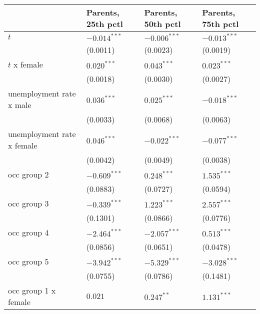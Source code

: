 \begin{tabular}{llll}
\toprule
{} & Parents, 25th pctl & Parents, 50th pctl & Parents, 75th pctl \\
\midrule
$t$                                    &     $-0.014^{***}$ &     $-0.006^{***}$ &     $-0.013^{***}$ \\
                                       &           (0.0011) &           (0.0023) &           (0.0019) \\
$t$ x female                           &      $0.020^{***}$ &      $0.043^{***}$ &      $0.023^{***}$ \\
                                       &           (0.0018) &           (0.0030) &           (0.0027) \\
unemployment rate x male               &      $0.036^{***}$ &      $0.025^{***}$ &     $-0.018^{***}$ \\
                                       &           (0.0033) &           (0.0068) &           (0.0063) \\
unemployment rate x female             &      $0.046^{***}$ &     $-0.022^{***}$ &     $-0.077^{***}$ \\
                                       &           (0.0042) &           (0.0049) &           (0.0038) \\
occ group 2                            &     $-0.609^{***}$ &      $0.248^{***}$ &      $1.535^{***}$ \\
                                       &           (0.0883) &           (0.0727) &           (0.0594) \\
occ group 3                            &     $-0.339^{***}$ &      $1.223^{***}$ &      $2.557^{***}$ \\
                                       &           (0.1301) &           (0.0866) &           (0.0776) \\
occ group 4                            &     $-2.464^{***}$ &     $-2.057^{***}$ &      $0.513^{***}$ \\
                                       &           (0.0856) &           (0.0651) &           (0.0478) \\
occ group 5                            &     $-3.942^{***}$ &     $-5.329^{***}$ &     $-3.028^{***}$ \\
                                       &           (0.0755) &           (0.0786) &           (0.1481) \\
occ group 1 x female                   &            $0.021$ &       $0.247^{**}$ &      $1.131^{***}$ \\

\end{tabular}

